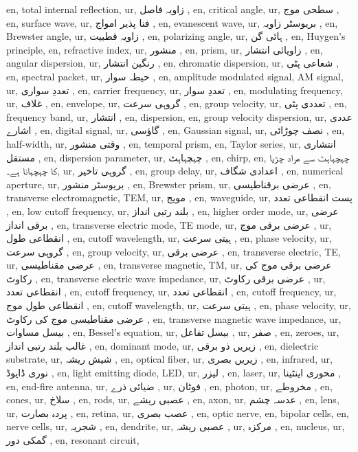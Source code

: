 en, total internal reflection,
ur, زاویہ فاصل ,
en, critical angle,
ur, سطحی موج ,
en, surface wave,
ur, فنا پذیر امواج ,
en, evanescent wave,
ur, بریوسٹر زاویہ ,
en, Brewster angle,
ur, زاویہ قطبیت ,
en, polarizing angle,
ur, ہائی گن ,
en, Huygen's principle,
en, refractive index,
ur, منشور ,
en, prism,
ur, زاویائی انتشار ,
en, angular dispersion,
ur, رنگین انتشار ,
en, chromatic dispersion,
ur, شعاعی پٹی ,
en, spectral packet,
ur, حیطہ سوار ,
en, amplitude modulated signal, AM signal,
ur, تعددِ سواری ,
en, carrier frequency,
ur, تعددِ سوار ,
en, modulating frequency,
ur, غلاف ,
en, envelope,
ur, گروہی سرعت  ,
en, group velocity,
ur, تعددی پٹی ,
en, frequency band,
ur, انتشار ,
en, dispersion,
en, group velocity dispersion,
ur, عددی اشارے ,
en, digital signal,
ur, گاؤسی ,
en, Gaussian signal,
ur, نصف چوڑائی ,
en, half-width,
ur, وقتی منشور ,
en, temporal prism,
en, Taylor series,
ur, انتشاری مستقل ,
en, dispersion parameter,
ur, چہچہاہٹ ,
en, chirp,
en, چہچہاہٹ سے مراد چڑیا کا چہچہانا ہے۔,
ur, گروہی تاخیر ,
en, group delay,
ur, اعدادی شگاف ,
en, numerical aperture,
ur, بریوسٹر منشور ,
en, Brewster prism,
ur, عرضی برقناطیسی ,
en, transverse electromagnetic, TEM,
ur, مویج ,
en, waveguide,
ur, پست انقطاعی تعدد ,
en, low cutoff frequency,
ur, بلند رتبی انداز ,
en, higher order mode,
ur, عرضی برقی انداز ,
en, transverse electric mode, TE mode,
ur, عرضی برقی موج ,
ur, انقطاعی طول ,
en, cutoff wavelength,
ur, ہیتی سرعت ,
en, phase velocity,
ur, گروہی سرعت ,
en, group velocity,
ur, عرضی برقی ,
en, transverse electric, TE,
ur, عرضی مقناطیسی ,
en, transverse magnetic, TM,
ur, عرضی برقی موج کی رکاوٹ ,
en, transverse electric wave impedance,
ur, عرضی برقی رکاوٹ ,
ur, انقطاعی تعدد ,
en, cutoff frequency,
ur, انقطاعی تعدد ,
en, cutoff frequency,
ur, انقطاعی طول موج ,
en, cutoff wavelength,
ur, ہیتی سرعت ,
en, phase velocity,
ur, عرضی مقناطیسی موج کی رکاوٹ ,
en, transverse magnetic wave impedance,
ur, بیسل مساوات ,
en, Bessel's equation,
ur, بیسل تفاعل ,
ur, صفر ,
en, zeroes,
ur, غالب بلند رتبی انداز ,
en, dominant mode,
ur, زیریں ذو برقی ,
en, dielectric substrate,
ur, شیش ریشہ ,
en, optical fiber,
ur, زیریں بصری ,
en, infrared,
ur, نوری ڈایوڈ ,
en, light emitting diode, LED,
ur, لیزر ,
en, laser,
ur, محوری اینٹینا ,
en, end-fire antenna,
ur, ضیائی ذرے ,
ur, فوٹان ,
en, photon,
ur, مخروطے ,
en, cones,
ur, سلاخ ,
en, rods,
ur, عصبی ریشے ,
en, axon,
ur, عدسہ چشم ,
en, lens,
ur, پردہ بصارت ,
en, retina,
ur, عصب بصری ,
en, optic nerve,
en, bipolar cells,
en, nerve cells,
ur, شجریہ ,
en, dendrite,
ur, عصبی ریشہ ,
ur, مرکزہ ,
en, nucleus,
ur, گمکی دور ,
en, resonant circuit,

